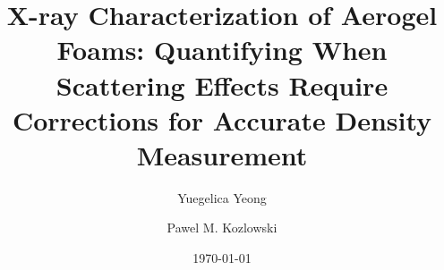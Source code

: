 



\title[Nice Title]{X-ray Characterization of Aerogel Foams: Quantifying When Scattering Effects Require Corrections for Accurate Density Measurement}

\author[A. Name]{Yuegelica Yeong \and Pawel M. Kozlowski}



\vspace{-2cm}\date{\today}


